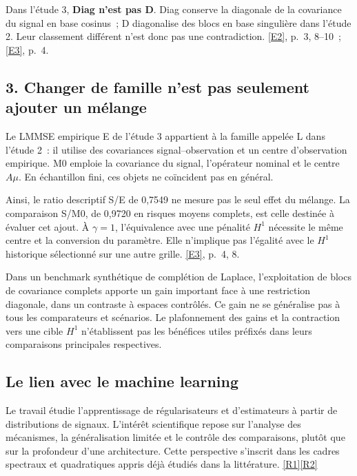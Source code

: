 \documentclass[11pt,a4paper]{article}
\DeclareRobustCommand{\eref}[1]{\hyperlink{ref#1}{[#1]}}
\begin{document}
Dans l'étude 3, \textbf{Diag n'est pas D}. Diag conserve la diagonale de la covariance du signal
en base cosinus~; D diagonalise des blocs en base singulière dans l'étude 2. Leur classement
différent n'est donc pas une contradiction. \eref{E2}, p.~3, 8--10~; \eref{E3}, p.~4.

\subsection*{3. Changer de famille n'est pas seulement ajouter un mélange}
Le LMMSE empirique E de l'étude 3 appartient à la famille appelée L dans l'étude 2~: il utilise
des covariances signal--observation et un centre d'observation empirique. M0 emploie la
covariance du signal, l'opérateur nominal et le centre $A\mu$. En échantillon fini, ces objets
ne coïncident pas en général.

Ainsi, le ratio descriptif S/E de 0,7549 ne mesure pas le seul effet du mélange. La comparaison
S/M0, de 0,9720 en risques moyens complets, est celle destinée à évaluer cet ajout.
À $\gamma=1$, l'équivalence avec une pénalité $H^1$ nécessite le même centre et la conversion
du paramètre. Elle n'implique pas l'égalité avec le $H^1$ historique sélectionné sur une autre
grille. \eref{E3}, p.~4, 8.

\begin{keybox}
Dans un benchmark synthétique de complétion de Laplace, l'exploitation de blocs de covariance
complets apporte un gain important face à une restriction diagonale, dans un contraste à
espaces contrôlés. Ce gain ne se généralise pas à tous les comparateurs et scénarios.
Le plafonnement des gains et la contraction vers une cible $H^1$ n'établissent pas les
bénéfices utiles préfixés dans leurs comparaisons principales respectives.
\end{keybox}

\subsection*{Le lien avec le machine learning}
Le travail étudie l'apprentissage de régularisateurs et d'estimateurs à partir de distributions
de signaux. L'intérêt scientifique repose sur l'analyse des mécanismes, la généralisation
limitée et le contrôle des comparaisons, plutôt que sur la profondeur d'une architecture.
Cette perspective s'inscrit dans les cadres spectraux et quadratiques appris déjà étudiés
dans la littérature. \eref{R1}\eref{R2}
\end{document}
